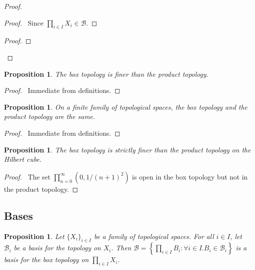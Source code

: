 \documentclass{book}
\let\qed\relax
\newtheorem{prop}[ax]{Proposition}
\theoremstyle{definition}
\begin{document}
\begin{proof}
\pf
{}
\begin{proof}
	\pf\ Since $\prod_{i \in I} X_i \in \mathcal{B}$.
\end{proof}
\begin{proof}
\end{proof}
\qed
\end{proof}

\begin{prop}
The box topology is finer than the product topology.
\end{prop}

\begin{proof}
\pf\ Immediate from definitions. \qed
\end{proof}

\begin{prop}
On a finite family of topological spaces, the box topology and the product topology are the same.
\end{prop}

\begin{proof}
\pf\ Immediate from definitions. \qed
\end{proof}

\begin{prop}
The box topology is strictly finer than the product topology on the Hilbert cube.
\end{prop}

\begin{proof}
\pf\ The set $\prod_{n=0}^\infty (0, 1/(n+1)^2)$ is open in the box topology but not in the product topology. \qed
\end{proof}

\subsection{Bases}

\begin{prop}
Let $\{X_i\}_{i \in I}$ be a family of topological spaces. For all $i \in I$, let $\mathcal{B}_i$ be a basis for the topology on $X_i$. Then $\mathcal{B} = \left\{ \prod_{i \in I} B_i : \forall i \in I. B_i \in \mathcal{B}_i \right\}$ is a basis for the box topology on $\prod_{i \in I} X_i$.
\end{prop}
\end{document}
